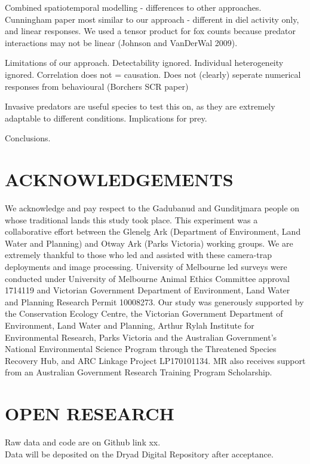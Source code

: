 \documentclass[]{elsarticle} %
\begin{document}
Combined spatiotemporal modelling - differences to other approaches.
Cunningham paper most similar to our approach - different in diel activity only, and linear responses.
We used a tensor product for fox counts because predator interactions may not be linear (Johnson and VanDerWal 2009).

Limitations of our approach.
Detectability ignored.
Individual heterogeneity ignored.
Correlation does not = causation.
Does not (clearly) seperate numerical responses from behavioural (Borchers SCR paper)

Invasive predators are useful species to test this on, as they are extremely adaptable to different conditions.
Implications for prey.

Conclusions.

\newpage

\hypertarget{acknowledgements}{%
\section{ACKNOWLEDGEMENTS}\label{acknowledgements}}

We acknowledge and pay respect to the Gadubanud and Gunditjmara people on whose traditional lands this study took place. This experiment was a collaborative effort between the Glenelg Ark (Department of Environment, Land Water and Planning) and Otway Ark (Parks Victoria) working groups. We are extremely thankful to those who led and assisted with these camera-trap deployments and image processing. University of Melbourne led surveys were conducted under University of Melbourne Animal Ethics Committee approval 1714119 and Victorian Government Department of Environment, Land Water and Planning Research Permit 10008273. Our study was generously supported by the Conservation Ecology Centre, the Victorian Government Department of Environment, Land Water and Planning, Arthur Rylah Institute for Environmental Research, Parks Victoria and the Australian Government's National Environmental Science Program through the Threatened Species Recovery Hub, and ARC Linkage Project LP170101134. MR also receives support from an Australian Government Research Training Program Scholarship.

\hypertarget{open-research}{%
\section{OPEN RESEARCH}\label{open-research}}

Raw data and code are on Github link xx.\\
Data will be deposited on the Dryad Digital Repository after acceptance.
\end{document}
